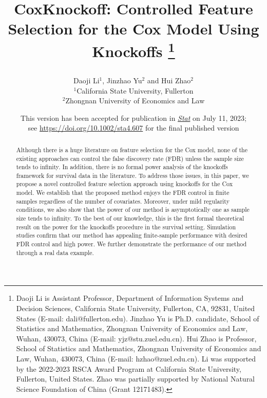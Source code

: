 \documentclass[11pt]{article}
\begin{document}
\title{CoxKnockoff: Controlled Feature Selection for the Cox Model Using Knockoffs%
\thanks{ 
Daoji Li is Assistant Professor, Department of Information Systems and Decision Sciences, California State
University, Fullerton, CA, 92831, United States (E-mail: dali@fullerton.edu). %
Jinzhao Yu is Ph.D. candidate, School of Statistics and Mathematics, Zhongnan University of Economics and Law, Wuhan, 430073, China (E-mail: yjz@stu.zuel.edu.cn). %
Hui Zhao is Professor, School of Statistics and Mathematics, Zhongnan University of Economics and Law, Wuhan, 430073, China (E-mail: hzhao@zuel.edu.cn). %
Li was supported by the 2022-2023 RSCA Award Program at California State University, Fullerton, United States. Zhao was partially supported by National Natural Science Foundation of China (Grant 12171483). 
}
\date{%
\medskip
\medskip
This version has been accepted for publication in \href{https://onlinelibrary.wiley.com/journal/20491573}{\textit{Stat}} on July 11, 2023;\\
see \url{https://doi.org/10.1002/sta4.607} for the final published version
}
\author{Daoji Li$^1$, Jinzhao Yu$^2$ and Hui Zhao$^2$
\medskip\\
$^1$California State University, Fullerton
\\ $^2$Zhongnan University of Economics and Law
\\
} %
}



\maketitle


	
\begin{abstract}	
Although there is a huge literature on feature selection for the Cox model, none of the existing approaches can control the false discovery rate (FDR) unless the sample size tends to infinity.
In addition, there is no formal power analysis of the knockoffs framework for survival data in the literature. To address those issues, in this paper, we propose a novel controlled feature selection approach using knockoffs for the Cox model. 
We establish that the proposed method enjoys the FDR control in finite samples regardless of the number of covariates.
Moreover, under mild regularity conditions, we also show that the power of our method is asymptotically one as sample size tends to infinity. To the best of our knowledge, this is the first formal theoretical result on the power for the knockoffs procedure  
in the survival setting. Simulation studies confirm that our method has appealing finite-sample performance with desired FDR control and high power. 
We further demonstrate the performance of our method through a real data example.
\end{abstract}
	
\end{document}
